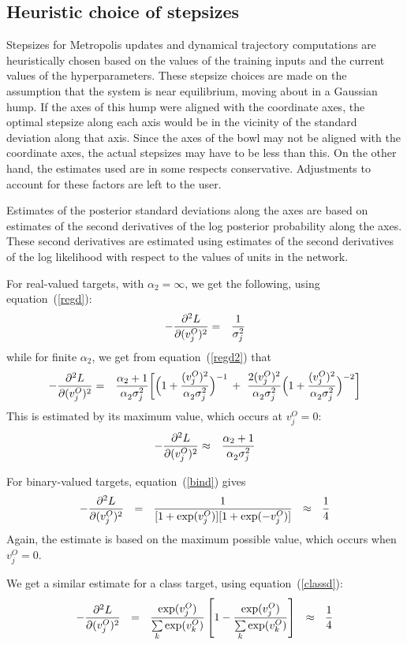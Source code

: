 \documentclass{report}[11pt]
\def\beq{\begin{eqnarray}}
\def\eeq{\end{eqnarray}}
\def\eep{\end{eqnarray}}
\begin{document}
\subsection*{Heuristic choice of stepsizes}\label{app-sec-heuristic}

Stepsizes for Metropolis updates and dynamical trajectory computations
are heuristically chosen based on the values of the training inputs
and the current values of the hyperparameters.  These stepsize choices
are made on the assumption that the system is near equilibrium, moving
about in a Gaussian hump.  If the axes of this hump were aligned with
the coordinate axes, the optimal stepsize along each axis would be in
the vicinity of the standard deviation along that axis.  Since the
axes of the bowl may not be aligned with the coordinate axes, the
actual stepsizes may have to be less than this.  On the other hand,
the estimates used are in some respects conservative.  Adjustments to
account for these factors are left to the user.

Estimates of the posterior standard deviations along the axes are
based on estimates of the second derivatives of the log posterior
probability along the axes.  These second derivatives are estimated
using estimates of the second derivatives of the log likelihood with
respect to the values of units in the network.

For real-valued targets, with $\alpha_2=\infty$, we get the following,
using equation~(\ref{regd}):\beq
  - {\partial^2 L \over \partial (v^O_j)^2} & = & {1 \over \sigma_j^2}
\eeq%
while for finite $\alpha_2$, we get from equation~(\ref{regd2}) that\beq
  - {\partial^2 L \over \partial (v^O_j)^2} & = &
    {\alpha_2 + 1 \over \alpha_2^{\ } \sigma_j^2} \bigg[
    \Big( 1 + {(v^O_j)^2 \over \alpha_2^{\ }\sigma_j^2} \Big)^{-1}
    \, +\
    {2(v^O_j)^2 \over \alpha_2^{\ }\sigma_j^2} 
    \Big( 1 + {(v^O_j)^2 \over \alpha_2^{\ }\sigma_j^2} \Big)^{-2}
   \bigg]
\eeq%
This is estimated by its maximum value, which occurs at $v^O_j=0$:\beq
  - {\partial^2 L \over \partial (v^O_j)^2} & \approx & 
    {\alpha_2 + 1 \over \alpha_2^{\ } \sigma_j^2} 
\label{maxhest}\eep

For binary-valued targets, equation~(\ref{bind}) gives\beq
  - {\partial^2 L \over \partial (v^O_j)^2} 
     \ \ =\ \ { 1 \over [1+\exp(v^O_j)] [1+\exp(-v^O_j)]}
     \ \ \approx\ \ {1 \over 4}
\eeq%
Again, the estimate is based on the maximum possible value, which occurs
when $v^O_j=0$.

We get a similar estimate for a class target, using equation~(\ref{classd}):\beq
  - {\partial^2 L \over \partial (v^O_j)^2} 
     \ \ =\ \ {\exp(v^O_j) \over \textstyle \sum\limits_k \exp(v^O_k)}
              \left[1 - {\exp(v^O_j) \over \textstyle \sum\limits_k \exp(v^O_k)}
              \right]
     \ \ \approx \ \ {1 \over 4}
\eep
\end{document}
